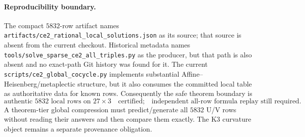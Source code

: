 \paragraph{Reproducibility boundary.}
The compact $5832$-row artifact names
\texttt{artifacts/ce2\_rational\_local\_solutions.json} as its source; that
source is absent from the current checkout. Historical metadata names
\texttt{tools/solve\_sparse\_ce2\_all\_triples.py} as the producer, but that
path is also absent and no exact-path Git history was found for it. The current
\texttt{scripts/ce2\_global\_cocycle.py} implements substantial
Affine--Heisenberg/metaplectic structure, but it also consumes the committed
local table as authoritative data for known rows. Consequently the safe theorem
boundary is
\[
\boxed{
\text{authentic }5832\text{ local rows on }27\times3
\quad\text{certified;}
\quad
\text{independent all-row formula replay still required.}
}
\]
A theorem-tier global compression must predict/generate all $5832$ U/V rows
without reading their answers and then compare them exactly. The K3 curvature
object remains a separate provenance obligation.
